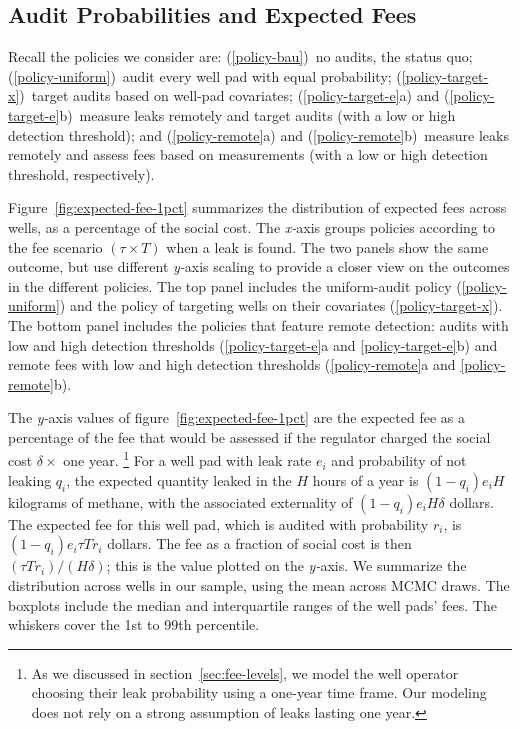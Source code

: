 \documentclass[12pt,oneside,letterpaper]{article}
\theoremstyle{definition}
\begin{document}
\begin{refsection}
\subsection{Audit Probabilities and Expected Fees}
\label{sec:audit-probabilities-and-expected-fees}



Recall the policies we consider are:
(\ref{policy-bau})~no audits, the status quo;
(\ref{policy-uniform})~audit every well pad with equal probability;
(\ref{policy-target-x})~target audits based on well-pad covariates;
(\ref{policy-target-e}a) and (\ref{policy-target-e}b)~measure leaks remotely and target audits (with a low or high detection threshold); and
(\ref{policy-remote}a) and (\ref{policy-remote}b)~measure leaks remotely and assess fees based on measurements (with a low or high detection threshold, respectively).

Figure~\ref{fig:expected-fee-1pct} summarizes the distribution of expected fees across wells, as a percentage of the social cost.
The \textit{x-}axis groups policies according to the fee scenario \((\tau \times T)\) when a leak is found.
The two panels show the same outcome, but use different \textit{y-}axis scaling to provide a closer view on the outcomes in the different policies.
The top panel includes the uniform-audit policy (\ref{policy-uniform}) and the policy of targeting wells on their covariates (\ref{policy-target-x}).
The bottom panel includes the policies that feature remote detection: audits with low and high detection thresholds (\ref{policy-target-e}a and \ref{policy-target-e}b) and remote fees with low and high detection thresholds (\ref{policy-remote}a and \ref{policy-remote}b).

The \textit{y-}axis values of figure~\ref{fig:expected-fee-1pct} are the expected fee as a percentage of the fee that would be assessed if the regulator charged the social cost \(\delta \times\) one year.%
\footnote{%
As we discussed in section~\ref{sec:fee-levels},
we model the well operator choosing their leak probability using a one-year time frame.
Our modeling does not rely on a strong assumption of leaks lasting one year.
}
For a well pad with leak rate \(e_i\) and probability of not leaking \(q_i\), the expected quantity leaked in the \(H\) hours of a year is
\((1 - q_i) e_i H\) kilograms of methane,
with the associated externality of
\((1 - q_i) e_i H \delta\) dollars.
The expected fee for this well pad, which is audited with probability \(r_i\), is
\((1 - q_i)  e_i \tau  T  r_i\) dollars.
The fee as a fraction of social cost is then
\((\tau  T  r_i ) / (H \delta)\);
this is the value plotted on the \textit{y-}axis.
We summarize the distribution across wells in our sample, using the mean across \gls{MCMC} draws.
The boxplots include the median and interquartile ranges of the well pads' fees.
The whiskers cover the 1st to 99th percentile.


\end{refsection}
\end{document}
